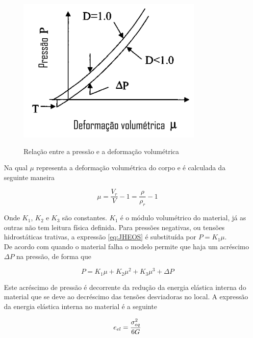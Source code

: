 \begin{figure} \label{fig:pressvsdefvolJH1}
    \centering
    \caption{Relação entre a pressão e a deformação volumétrica} 
    \includegraphics[width=0.7\linewidth]{images/defvolpressao.png}
    \label{fig:my_label}
\end{figure}

Na qual $ \mu $ representa a deformação volumétrica do corpo e é calculada da seguinte maneira

\begin{equation}
    \mu = \frac{V_r}{V} - 1 = \frac{\rho}{\rho_r} - 1
\end{equation}

Onde $ K_1 $, $ K_2 $ e $ K_3 $ são constantes. $ K_1 $ é o módulo volumétrico do material, já as outras não tem leitura física definida. Para pressões negativas, ou tensões hidrostáticas trativas, a expressão  \ref{eq:JHEOS} é substituída por $ P = K_1 \mu $. \\


De acordo com \cite{holmquist_johnson_2002}
quando o material falha o modelo permite que haja um acréscimo $ \Delta P $ na pressão, de forma que 

\begin{equation} \label{eq:EOSJH2}
	P = K_1 \mu + K_2 \mu^2 + K_3 \mu^3 + \Delta P
\end{equation}


Este acréscimo de pressão é decorrente da redução da energia elástica interna  do material que se deve ao decréscimo das tensões desviadoras no local. A expressão da energia elástica interna no material é a seguinte

\begin{equation}
	e_{el} = \frac{\displaystyle \sigma_{eq}^2}{\displaystyle 6G}
\end{equation}

